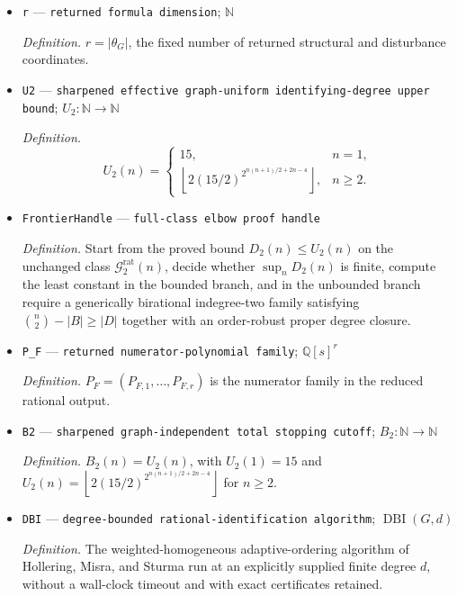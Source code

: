\documentclass{article}
\begin{document}
\begin{itemize}
  \par\smallskip\noindent\emph{Definition.} \(\widehat\Sigma=N^{-1}\sum_{i=1}^N(X_i-\bar X)(X_i-\bar X)^{\mathsf T}\).
  \item \texttt{r} --- \texttt{returned formula dimension}; \(\mathbb N\)
  \par\smallskip\noindent\emph{Definition.} \(r=|\theta_G|\), the fixed number of returned structural and disturbance coordinates.
  \item \texttt{U2} --- \texttt{sharpened effective graph-\allowbreak{}uniform identifying-\allowbreak{}degree upper bound}; \(U_2:\mathbb N\to\mathbb N\)
  \par\smallskip\noindent\emph{Definition.} \[U_2(n)=\begin{cases}15,&n=1,\\ \left\lfloor2(15/2)^{2^{n(n+1)/2+2n-4}}\right\rfloor,&n\geq2.\end{cases}\]
  \item \texttt{FrontierHandle} --- \texttt{full-\allowbreak{}class elbow proof handle}
  \par\smallskip\noindent\emph{Definition.} Start from the proved bound \(D_2(n)\leq U_2(n)\) on the unchanged class \(\mathcal G_{2}^{\mathrm{rat}}(n)\), decide whether \(\sup_nD_2(n)\) is finite, compute the least constant in the bounded branch, and in the unbounded branch require a generically birational indegree-two family satisfying \(\binom n2-|B|\geq|D|\) together with an order-robust proper degree closure.
  \item \texttt{P\_\allowbreak{}F} --- \texttt{returned numerator-\allowbreak{}polynomial family}; \(\mathbb Q[s]^r\)
  \par\smallskip\noindent\emph{Definition.} \(P_F=(P_{F,1},\ldots,P_{F,r})\) is the numerator family in the reduced rational output.
  \item \texttt{B2} --- \texttt{sharpened graph-\allowbreak{}independent total stopping cutoff}; \(B_2:\mathbb N\to\mathbb N\)
  \par\smallskip\noindent\emph{Definition.} \(B_2(n)=U_2(n)\), with \(U_2(1)=15\) and \(U_2(n)=\left\lfloor2(15/2)^{2^{n(n+1)/2+2n-4}}\right\rfloor\) for \(n\geq2\).
  \item \texttt{DBI} --- \texttt{degree-\allowbreak{}bounded rational-\allowbreak{}identification algorithm}; \(\operatorname{DBI}(G,d)\)
  \par\smallskip\noindent\emph{Definition.} The weighted-homogeneous adaptive-ordering algorithm of Hollering, Misra, and Sturma run at an explicitly supplied finite degree \(d\), without a wall-clock timeout and with exact certificates retained.

\end{itemize}
\end{document}
